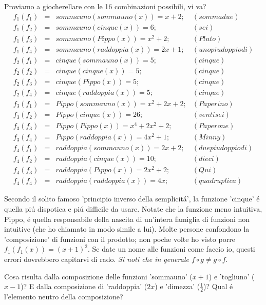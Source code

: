 Proviamo a giocherellare con le 16 combinazioni possibili, vi va?
\begin{equation}
 \begin{array}{rcll}
f_1(f_1) & = & sommauno(sommauno(x))=x+2; & (sommadue) \\
f_1(f_2) & = & sommauno(cinque(x))=6; & (sei) \\
f_1(f_3) & = & sommauno(Pippo(x))=x^2+2; & (Pluto) \\
f_1(f_4) & = & sommauno(raddoppia(x))=2x+1; & (unopiudoppiodi)\\
f_2(f_1) & = & cinque(sommauno(x))=5; & (cinque)\\
f_2(f_2) & = & cinque(cinque(x))=5; & (cinque)\\
f_2(f_3) & = & cinque(Pippo(x))=5; & (cinque)\\
f_2(f_4) & = & cinque(raddoppia(x))=5; & (cinque)\\
f_3(f_1) & = & Pippo(sommauno(x))=x^2+2x+2; & (Paperino)\\
f_3(f_2) & = & Pippo(cinque(x))=26; &	(ventisei)\\
f_3(f_3) & = & Pippo(Pippo(x))=x^4+2x^2+2; &(Paperone)\\
f_3(f_4) & = & Pippo(raddoppia(x))=4x^2+1; &(Minny)\\
f_4(f_1) & = & raddoppia(sommauno(x))=2x+2; &(duepiudoppiodi)\\
f_4(f_2) & = & raddoppia(cinque(x))=10;& (dieci)\\
f_4(f_3) & = & raddoppia(Pippo(x))=2x^2+2;& (Qui)\\
f_4(f_4) & = & raddoppia(raddoppia(x))=4x;& (quadruplica)
 \end{array}
\end{equation}

Secondo il solito famoso 'principio inverso della semplicit\'a', la funzione 'cinque' \'e quella pi\'u dispotica e pi\'u difficile da usare. Notate che la
funzione meno intuitiva, Pippo, \'e quella responsabile della nascita di un'intera famiglia di funzioni non intuitive (che ho chiamato in modo simile a lui).
Molte persone confondono la 'composizione' di funzioni con il prodotto; non poche volte ho visto porre $f_1(f_1(x))=(x+1)^2$. Se date un nome alle funzioni
come faccio io, questi errori  dovrebbero capitarvi di rado. {\em Si noti che in generale $f \circ g \neq g \circ f$}.

\begin{esercizio}
Cosa risulta dalla composizione delle funzioni 'sommauno' ($x+1$) e 'togliuno' ($x-1$)? E dalla composizione di 'raddoppia' ($2x$) e 'dimezza' ($\frac{1}{2}$)?
Qual \'e l'elemento neutro della composizione?
\end{esercizio}
